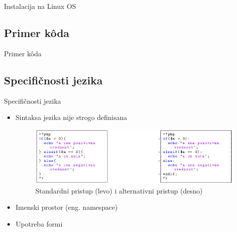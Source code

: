 \documentclass{beamer}
\begin{document}
\begin{frame}{Instalacija na Linux OS}

\end{frame}

\subsection{Primer k\^{o}da}
\begin{frame}{Primer k\^{o}da}
    
\end{frame}

\subsection{Specifičnosti jezika}
\begin{frame}{Specifičnosti jezika}
    \begin{itemize}
		\item Sintaksa jezika nije strogo definisana
		
		\begin{figure}[h!]
                \begin{center}
                \includegraphics[scale=0.40]{kod.png}
                \end{center}
                \caption{Standardni pristup (levo) i alternativni pristup (desno)}
                \label{fig:kod}
                \end{figure}
                
		\item Imenski prostor (eng. namespace)
		\item Upotreba formi
	\end{itemize}
\end{frame}
\end{document}
